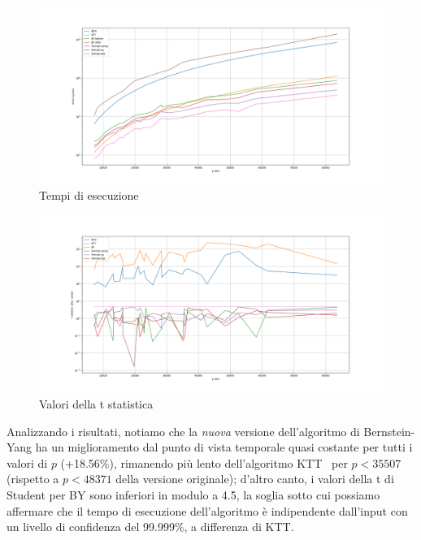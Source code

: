 \begin{figure}
    \includegraphics[width=\linewidth]{images/mean.png}
    \caption{Tempi di esecuzione}
\end{figure}
\begin{figure}
    \includegraphics[width=\linewidth]{images/tstat.png}
    \caption{Valori della t statistica}
\end{figure}


Analizzando i risultati, notiamo che la \textit{nuova} versione dell'algoritmo di Bernstein-Yang ha un miglioramento
dal punto di vista temporale quasi costante per tutti i valori di $p$ (+18.56\%), rimanendo più lento dell'algoritmo
KTT~\cite{takagi2001fast} per $p < 35507$ (rispetto a $p < 48371$ della versione originale); d'altro canto, i valori della t di Student per BY sono inferiori in modulo a 4.5, la 
soglia sotto cui possiamo affermare che il tempo di esecuzione dell'algoritmo è indipendente dall'input con un
livello di confidenza del 99.999\%, a differenza di KTT. 



